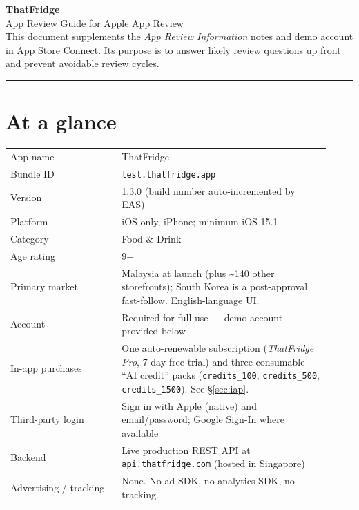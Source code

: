 \documentclass[11pt]{article}
\begin{document}
\begin{center}
  {\huge\bfseries\color{brand} ThatFridge}\\[2pt]
  {\large App Review Guide for Apple App Review}\\[6pt]
  {\small This document supplements the \emph{App Review Information} notes and demo
  account in App Store Connect. Its purpose is to answer likely review questions up front
  and prevent avoidable review cycles.}
\end{center}

\vspace{4pt}
\hrule height 0.6pt
\vspace{10pt}

\section{At a glance}

\begin{tabular}{@{}L{0.32\linewidth} L{0.6\linewidth}@{}}
\toprule
App name            & ThatFridge \\
Bundle ID           & \texttt{test.thatfridge.app} \\
Version             & 1.3.0 (build number auto-incremented by EAS) \\
Platform            & iOS only, iPhone; minimum iOS 15.1 \\
Category            & Food \& Drink \\
Age rating          & 9+ \\
Primary market      & Malaysia at launch (plus \textasciitilde140 other storefronts); South Korea is a
                      post-approval fast-follow. English-language UI. \\
Account             & Required for full use --- demo account provided below \\
In-app purchases    & One auto-renewable subscription (\emph{ThatFridge Pro}, 7-day free trial) and
                      three consumable ``AI credit'' packs (\texttt{credits\_100}, \texttt{credits\_500},
                      \texttt{credits\_1500}). See \S\ref{sec:iap}. \\
Third-party login   & Sign in with Apple (native) and email/password; Google Sign-In where available \\
Backend             & Live production REST API at \texttt{api.thatfridge.com} (hosted in Singapore) \\
Advertising / tracking & None. No ad SDK, no analytics SDK, no tracking. \\
\bottomrule
\end{tabular}
\end{document}
